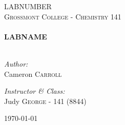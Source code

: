 \begin{titlepage}
\begin{center}

\textsc{\Large LABNUMBER}\\[1.5cm]
\textsc{\Large Grossmont College - Chemistry 141}\\[0.5cm]

\HRule \\[0.4cm]
{ \LARGE \bfseries LABNAME}\\[0.5cm]

\HRule \\[1.5cm]

\begin{minipage}{0.4\textwidth}
\begin{flushleft} \large
\emph{Author:}\\
Cameron \textsc{Carroll}
\end{flushleft}
\end{minipage}
\begin{minipage}{0.4\textwidth}
\begin{flushright} \large
\emph{Instructor \& Class:}\\
Judy \textsc{George} - 141 (8844)
\end{flushright}
\end{minipage}

\vfill

{\large \today}

\end{center}
\end{titlepage}